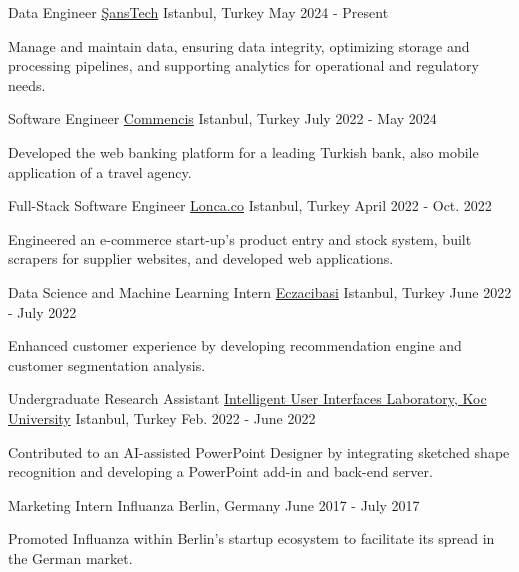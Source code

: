 
\begin{cventries}
  \cventry
    {Data Engineer}
    {\href{https://www.sans-technology.com/}{ŞansTech}}
    {Istanbul, Turkey}
    {May 2024 - Present}
    {
      \begin{cvitems}
        \item {Manage and maintain data, ensuring data integrity, optimizing storage and processing pipelines, and supporting analytics for operational and regulatory needs.}
      \end{cvitems}
    }

  \cventry
    {Software Engineer}
    {\href{https://www.commencis.com}{Commencis}}
    {Istanbul, Turkey}
    {July 2022 - May 2024}
    {
      \begin{cvitems}
        \item {Developed the web banking platform for a leading Turkish bank, also mobile application of a travel agency.}
      \end{cvitems}
    }

  \cventry
    {Full-Stack Software Engineer}
    {\href{https://lonca.co}{Lonca.co}}
    {Istanbul, Turkey}
    {April 2022 - Oct. 2022}
    {
      \begin{cvitems}
        \item {Engineered an e-commerce start-up's product entry and stock system, built scrapers for supplier websites, and developed web applications.}
      \end{cvitems}
    }

  \cventry
    {Data Science and Machine Learning Intern}
    {\href{https://www.eczacibasi.com.tr/en/home}{Eczacibasi}}
    {Istanbul, Turkey}
    {June 2022 - July 2022}
    {
      \begin{cvitems}
        \item {Enhanced customer experience by developing recommendation engine and customer segmentation analysis.}
      \end{cvitems}
    }

  \cventry
    {Undergraduate Research Assistant}
    {\href{https://iui.ku.edu.tr}{Intelligent User Interfaces Laboratory, Koc University}}
    {Istanbul, Turkey}
    {Feb. 2022 - June 2022}
    {
      \begin{cvitems}
        \item {Contributed to an AI-assisted PowerPoint Designer by integrating sketched shape recognition and developing a PowerPoint add-in and back-end server.}
      \end{cvitems}
    }

  \cventry
    {Marketing Intern}
    {Influanza}
    {Berlin, Germany}
    {June 2017 - July 2017}
    {
      \begin{cvitems}
        \item {Promoted Influanza within Berlin's startup ecosystem to facilitate its spread in the German market.}
      \end{cvitems}
    }

\end{cventries}
